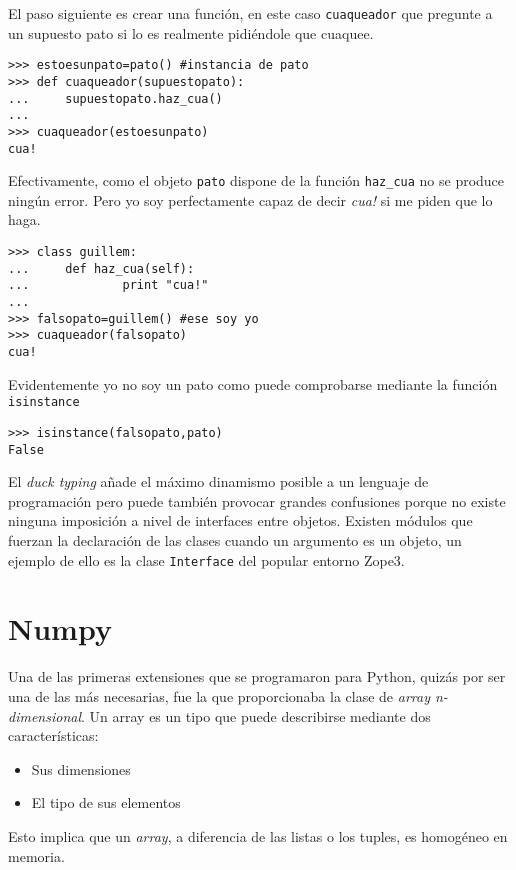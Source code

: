 \documentclass[a4paper,10pt]{article}
\begin{document}
El paso siguiente es crear una función, en este caso
\texttt{cuaqueador} que pregunte a un supuesto pato si lo es realmente
pidiéndole que cuaquee.

\begin{lstlisting}
>>> estoesunpato=pato() #instancia de pato
>>> def cuaqueador(supuestopato):
...     supuestopato.haz_cua()
...
>>> cuaqueador(estoesunpato)
cua!
\end{lstlisting}

Efectivamente, como el objeto \texttt{pato} dispone de la función
\texttt{haz\_cua} no se produce ningún error.  Pero yo soy
perfectamente capaz de decir \emph{cua!} si me piden que lo haga.

\begin{lstlisting}
>>> class guillem:
...     def haz_cua(self):
...             print "cua!"
...
>>> falsopato=guillem() #ese soy yo
>>> cuaqueador(falsopato)
cua!
\end{lstlisting}

Evidentemente yo no soy un pato como puede comprobarse mediante la
función \texttt{isinstance}

\begin{lstlisting}
>>> isinstance(falsopato,pato)
False
\end{lstlisting}

El \emph{duck typing} añade el máximo dinamismo posible a un lenguaje
de programación pero puede también provocar grandes confusiones porque
no existe ninguna imposición a nivel de interfaces entre objetos.
Existen módulos que fuerzan la declaración de las clases cuando un
argumento es un objeto, un ejemplo de ello es la clase
\texttt{Interface} del popular entorno Zope3.

\section{Numpy}

Una de las primeras extensiones que se programaron para Python, quizás
por ser una de las más necesarias, fue la que proporcionaba la clase
de \emph{array n-dimensional}.  Un array es un tipo que puede
describirse mediante dos características:

\begin{itemize}
\item Sus dimensiones
\item El tipo de sus elementos
\end{itemize}

Esto implica que un \emph{array}, a diferencia de las listas o los
tuples, es homogéneo en memoria.
\end{document}
